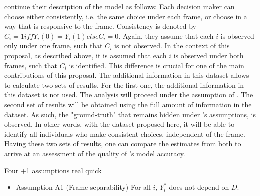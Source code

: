 \textcite{goldin2020} continue their description of the model as follows: Each
decision maker can choose either consistently, i.e. the same choice under each frame,
or choose in a way that is responsive to the frame. Consistency is denoted by $ C_i = 1 iff Y_i(0) = Y_i(1) else C_i = 0 $.
Again, they assume that each $ i $ is observed only under one frame, such that $C_i$ is not observed.
In the context of this proposal, as described above, it is assumed that each $ i $ is observed under both frames, such that
$ C_i $ is identified. This difference is crucial for one of the main contributions of this proposal.
The additional information in this dataset allows to calculate two sets of results. For the first one, the additional information in this dataset is not used.
The analysis will proceed under the assumption of \textcite{goldin2020}. The second set of results will be obtained using the full amount of information
in the dataset. As such, the "ground-truth" that remains hidden under \textcite{goldin2020}'s assumptions, is observed. In other words, with the dataset proposed 
here, it will be able to identify all individuals who make consistent choices, independent of the frame. 
Having these two sets of results, one can compare the estimates from both to arrive at an assessment of the quality of \textcite{goldin2020}'s model accuracy.

Four +1 assumptions real quick


\begin{itemize}
    \item Assumption A1 (Frame separability) For all $ i $, $ Y^*_{i} $ does not depend on $ D $.
\end{itemize}

